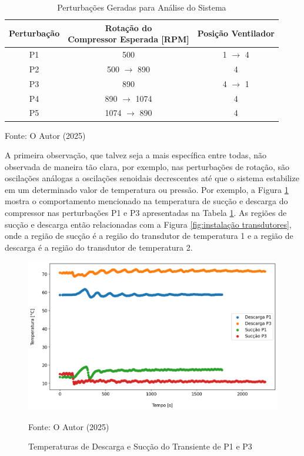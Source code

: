 \begin{table}[htb]
    \centering
    \begin{tabular}{|c|c|c|}
        \hline
        \textbf{Perturbação} & \makecell{\textbf{Rotação do} \\ \textbf{Compressor Esperada [RPM]}} & \textbf{Posição Ventilador}\\      
        \hline
        P1 & 500 & 1 $\rightarrow$ 4  \\
        P2 & 500 $\rightarrow$ 890 & 4  \\
        P3 & 890 & 4 $\rightarrow$ 1  \\
        P4 & 890 $\rightarrow$ 1074 & 4  \\
        P5 & 1074 $\rightarrow$ 890 & 4  \\
        \hline
    \end{tabular}
    \caption{Perturbações Geradas para Análise do Sistema}
    \vspace{5pt} 
{\footnotesize Fonte: O Autor (2025)}
    \label{tab:posiçõesVentilador}
\end{table}

A primeira observação, que talvez seja a mais específica entre todas, não observada de maneira tão clara, por exemplo, nas perturbações de rotação, são oscilações análogas a oscilações senoidais decrescentes até que o sistema estabilize em um determinado valor de temperatura ou pressão. Por exemplo, a Figura \ref{fig:TempSuccaoPertubacaoVentilador} mostra o comportamento mencionado na temperatura de sucção e descarga do compressor nas perturbações P1 e P3 apresentadas na Tabela \ref{tab:posiçõesVentilador}. As regiões de sucção e descarga então relacionadas com a Figura \ref{fig:instalação transdutores}, onde a região de sucção é a região do transdutor de temperatura 1 e a região de descarga é a região do transdutor de temperatura 2.
\newpage
\begin{figure}[h]
    \centering
    \includegraphics[width=1\linewidth]{FigurasdoTexto/Temperaturas de descarga e sucção Transiente P1 e P3.png}
    \caption{Temperaturas de Descarga e Sucção do Transiente de P1 e P3}
    \label{fig:TempSuccaoPertubacaoVentilador}
    {\footnotesize Fonte: O Autor (2025)}
\end{figure}

